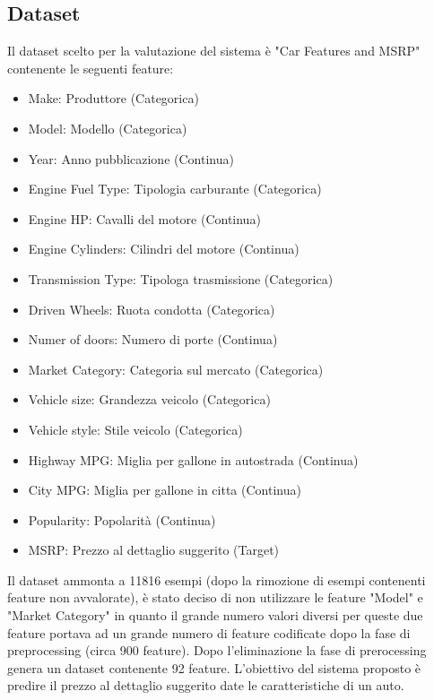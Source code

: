 \documentclass{article}
\begin{document}
    \subsection{Dataset}
    Il dataset scelto per la valutazione del sistema è "Car Features and MSRP" contenente
    le seguenti feature:
    \begin{itemize}
        \item Make: Produttore (Categorica)
        \item Model: Modello (Categorica)
        \item Year: Anno pubblicazione (Continua)
        \item Engine Fuel Type: Tipologia carburante (Categorica)
        \item Engine HP: Cavalli del motore (Continua)
        \item Engine Cylinders: Cilindri del motore (Continua)
        \item Transmission Type: Tipologa trasmissione (Categorica)
        \item Driven Wheels: Ruota condotta (Categorica)
        \item Numer of doors: Numero di porte (Continua)
        \item Market Category: Categoria sul mercato (Categorica)
        \item Vehicle size: Grandezza veicolo (Categorica)
        \item Vehicle style: Stile veicolo (Categorica)
        \item Highway MPG: Miglia per gallone in autostrada (Continua)
        \item City MPG: Miglia per gallone in citta (Continua)
        \item Popularity: Popolarità (Continua)
        \item MSRP: Prezzo al dettaglio suggerito (Target)
    \end{itemize}

    Il dataset ammonta a 11816 esempi (dopo la rimozione di esempi contenenti 
    feature non avvalorate),
    è stato deciso di non utilizzare le feature "Model" e "Market Category" in 
    quanto il grande
    numero valori diversi per queste due feature portava ad un grande numero di 
    feature codificate dopo la fase di preprocessing (circa 900 feature). 
    Dopo l'eliminazione la fase di prerocessing genera un dataset contenente
    92 feature. L'obiettivo del sistema proposto è predire il prezzo al dettaglio
    suggerito date le caratteristiche di un auto.
\end{document}
